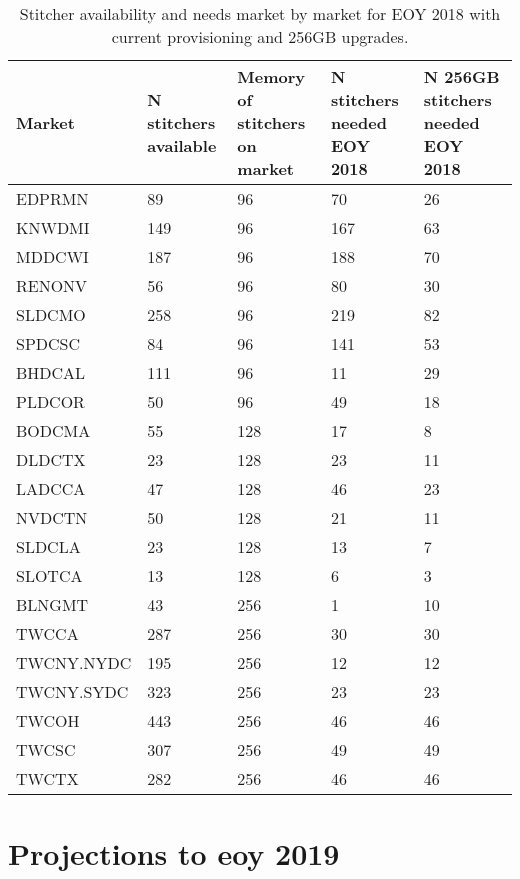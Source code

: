 \documentclass{article}
\begin{document}
\begin{table}
\begin{tabular}{|l|p{17mm}|p{17mm}|p{17mm}|p{17mm}|} 
\hline Market & N stitchers available & Memory of stitchers on market & N stitchers needed EOY 2018 & N 256GB stitchers needed EOY 2018 \\
\hline EDPRMN & 89 & 96 & 70 & 26 \\
\rowcolor{orange}\hline KNWDMI & 149 & 96 & 167 & 63 \\
\rowcolor{orange}\hline MDDCWI & 187 & 96 & 188 & 70 \\
\rowcolor{orange}\hline RENONV & 56 & 96 & 80 & 30 \\
\hline SLDCMO & 258 & 96 & 219 & 82  \\
\rowcolor{orange}\hline SPDCSC & 84 & 96 & 141 & 53 \\
\hline BHDCAL & 111 & 96 & 11 & 29\\
\rowcolor{yellow}\hline PLDCOR & 50 & 96 & 49 & 18 \\
\hline BODCMA & 55 & 128 & 17 & 8  \\
\rowcolor{yellow}\hline DLDCTX & 23 & 128 & 23 & 11 \\
\rowcolor{yellow}\hline LADCCA & 47 & 128 & 46 & 23 \\
\hline NVDCTN & 50 & 128 & 21 & 11  \\
\hline SLDCLA & 23 & 128 & 13 & 7 \\
\hline SLOTCA & 13 & 128 & 6 & 3 \\
\hline BLNGMT & 43 & 256 & 1 & 10\\
\hline TWCCA & 287 & 256 & 30 & 30 \\
\hline TWCNY.NYDC & 195 & 256 & 12 & 12 \\
\hline TWCNY.SYDC & 323 & 256 & 23 & 23 \\
\hline TWCOH & 443 & 256 & 46 & 46 \\
\hline TWCSC & 307 & 256 & 49 & 49 \\
\hline TWCTX & 282 & 256 & 46 & 46 \\
\hline 
\end{tabular}
\caption{\label{TABLE-StitchersNeeded2018}Stitcher availability and needs market by market for EOY 2018 with current provisioning and 256GB upgrades.} 
\end{table}

\section{Projections to eoy 2019}
\label{SECTION-2019Proj}
\end{document}
